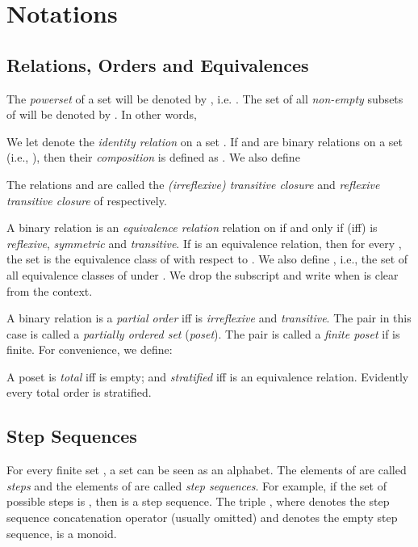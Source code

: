 \documentclass{llncs}
\begin{document}
\section{Notations \label{sec:background}}


\subsection{Relations, Orders and Equivalences}

The \emph{powerset} of a set  will be denoted by , i.e.
. The set of all {\em non-empty} subsets of 
will be denoted by . In other words,
 

We let  denote the \emph{identity relation} on a set . If  and  are binary relations on a set  (i.e., ), then their \emph{composition}  is defined as . We also define

The relations  and  are called the \emph{(irreflexive) transitive closure} and \emph{reflexive transitive closure} of  respectively.


A binary relation  is an \emph{equivalence relation} relation on  if and only if (iff)  is {\em reflexive},  {\em symmetric} and {\em transitive}. If  is an equivalence relation, then for every , the set  is the equivalence class of  with respect to . We also define , i.e., the set of all equivalence classes of  under . We drop the subscript and write  when  is clear from the context. 

A binary relation  is a
{\em partial order} iff  is {\em irreflexive} and {\em transitive}.
The pair  in this case is called a \emph{partially ordered set} (\emph{poset}). The pair  is called a \emph{finite poset} if  is finite. For convenience, we define:



A poset  is {\em total} iff  is empty; and {\em stratified} iff  is an equivalence relation. Evidently every total order is stratified.


\subsection{Step Sequences\label{sec:steps}}
For every finite set , a set  can be seen as an alphabet. 
The elements of  are called {\em steps} and
the elements of  are called {\em step sequences}. For example, if the set of possible steps is 
, then
 is a step sequence.
The triple , where  denotes the step sequence concatenation operator (usually omitted) and  denotes the empty step sequence, is a monoid.
\end{document}
